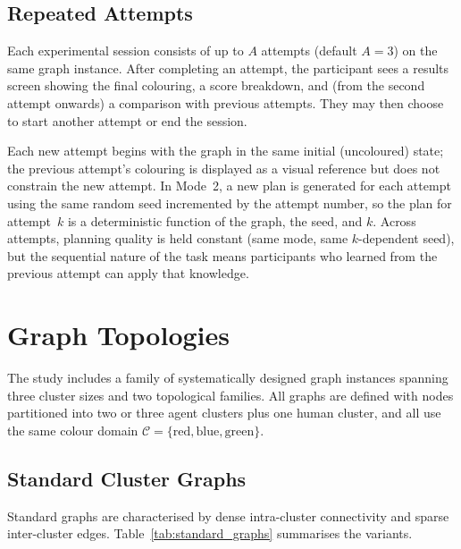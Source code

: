 \documentclass[11pt]{article}
\theoremstyle{definition}
\begin{document}
\subsection{Repeated Attempts}

Each experimental session consists of up to $A$ attempts (default $A = 3$) on the same
graph instance.  After completing an attempt, the participant sees a results screen
showing the final colouring, a score breakdown, and (from the second attempt onwards)
a comparison with previous attempts.  They may then choose to start another attempt or
end the session.

Each new attempt begins with the graph in the same initial (uncoloured) state; the
previous attempt's colouring is displayed as a visual reference but does not constrain
the new attempt.  In Mode~2, a new plan is generated for each attempt using the
same random seed incremented by the attempt number, so the plan for attempt~$k$ is a
deterministic function of the graph, the seed, and $k$.  Across attempts, planning
quality is held constant (same mode, same $k$-dependent seed), but the sequential
nature of the task means participants who learned from the previous attempt can apply
that knowledge.

\section{Graph Topologies}
\label{sec:graphs}

The study includes a family of systematically designed graph instances spanning three
cluster sizes and two topological families.  All graphs are defined with nodes partitioned
into two or three agent clusters plus one human cluster, and all use the same colour domain
$\mathcal{C} = \{\text{red}, \text{blue}, \text{green}\}$.

\subsection{Standard Cluster Graphs}

Standard graphs are characterised by dense intra-cluster connectivity and sparse
inter-cluster edges.  Table~\ref{tab:standard_graphs} summarises the variants.
\end{document}
